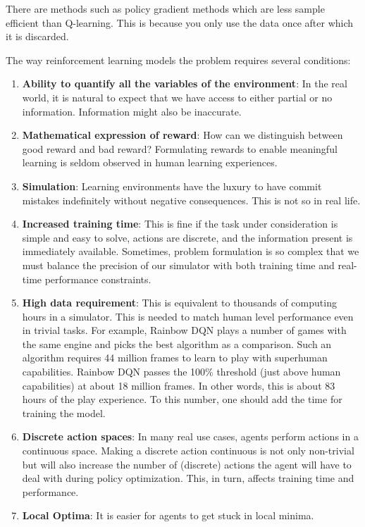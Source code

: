 \documentclass[conference]{IEEEtran}
\begin{document}
There are methods such as policy gradient methods which are less sample efficient than Q-learning. This is because you only use the data once after which it is discarded.

The way reinforcement learning models the problem requires several conditions:
\begin{enumerate}
    \item \textbf{Ability to quantify all the variables of the environment}: In the real world, it is natural to expect that we have access to either partial or no information. Information might also be inaccurate.

    \item \textbf{Mathematical expression of reward}: How can we distinguish between good reward and bad reward? Formulating rewards to enable meaningful learning is seldom observed in human learning experiences.

    \item \textbf{Simulation}: Learning environments have the luxury to have commit mistakes indefinitely without negative consequences. This is not so in real life.
    
    \item \textbf{Increased training time}: This is fine if the task under consideration is simple and easy to solve, actions are discrete, and the information present is immediately available. Sometimes, problem formulation is so complex that we must balance the precision of our simulator with both training time and real-time performance constraints.
    
    \item \textbf{High data requirement}: This is equivalent to thousands of computing hours in a simulator. This is needed to match human level performance even in trivial tasks. For example, Rainbow DQN plays a number of games with the same engine and picks the best algorithm as a comparison. Such an algorithm requires 44 million frames to learn to play with superhuman capabilities. Rainbow DQN passes the 100\% threshold (just above human capabilities) at about 18 million frames. In other words, this is about 83 hours of the play experience. To this number, one should add the time for training the model.
    
    \item \textbf{Discrete action spaces}: In many real use cases, agents perform actions in a continuous space. Making a discrete action continuous is not only non-trivial but will also increase the number of (discrete) actions the agent will have to deal with during policy optimization. This, in turn, affects training time and performance.
    
    \item \textbf{Local Optima}: It is easier for agents to get stuck in local minima. 
\end{enumerate}
\end{document}
